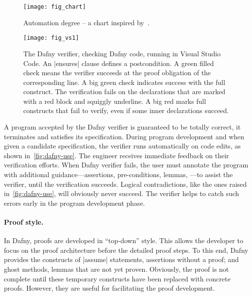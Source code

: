 \begin{figure}[ht]
\centering
\texttt{[image: fig\_chart]}
\caption{Automation degree -- a chart inspired by~\cite{leino2010b}.}
\label{fig:dafny-auto}
\end{figure}

\begin{figure}[p]
\begin{center}
\texttt{[image: fig\_vs1]}
\end{center}
\caption[Dafny running in Visual Studio Code]
{The Dafny verifier, checking Dafny code, running in Visual Studio Code.
An \pr|ensures| clause defines a postcondition.
A green filled check {\color{dafnyok}{\scalebox{.8}{\faCheckCircle}}}
means the verifier succeeds at the proof obligation of the corresponding line.
A big green check{ }{ }\circled[dafnyok]{\faCheck}{ }indicates success with the full construct.
The verification fails on the declarations that are marked with a red block and squiggly underline.
A big red{ }{ }\circled[dafnyno]{\faTimes}{ }marks full constructs that fail to verify, even if some inner declarations succeed.}
\label{fig:dafny-use}
\end{figure}

A program accepted by the Dafny verifier is guaranteed to be totally correct, \ie it terminates and satisfies its specification.
During program development and when given a candidate specification, the verifier runs automatically on code edits, as shown in~\autoref{fig:dafny-use}.
The engineer receives immediate feedback on their verification efforts.
When Dafny verifier fails, the user must annotate the program with additional guidance---assertions, pre-conditions, lemmas, \etc---to assist the verifier, until the verification succeeds.
Logical contradictions, like the ones raised in~\autoref{fig:dafny-use}, will obviously never succeed.
The verifier helps to catch such errors early in the program development phase.

\paragraph*{Proof style.}
In Dafny, proofs are developed in \enquote{top-down} style.
This allows the developer to focus on the proof architecture before the detailed proof steps.
To this end, Dafny provides the constructs of \pr|assume| statements, \ie assertions without a proof;
and ghost methods, \ie lemmas that are not yet proven.
Obviously, the proof is not complete until these temporary constructs have been replaced with concrete proofs.
However, they are useful for facilitating the proof development.

